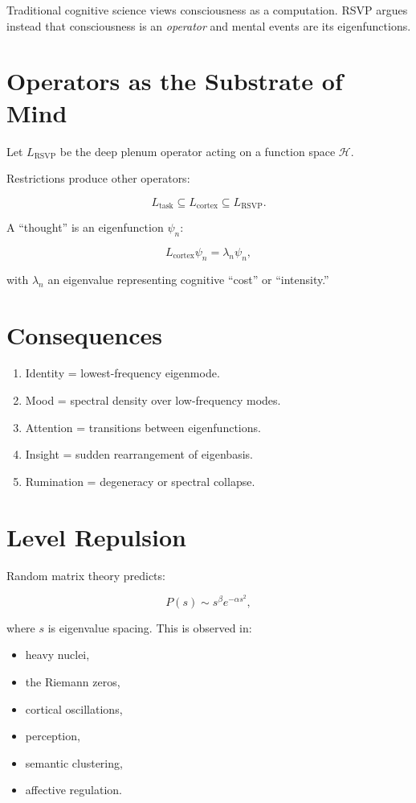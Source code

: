 \documentclass[12pt]{article}
\begin{document}
Traditional cognitive science views consciousness as a computation.  
RSVP argues instead that consciousness is an \emph{operator} and mental events are its eigenfunctions.

\section{Operators as the Substrate of Mind}

Let $L_{\text{RSVP}}$ be the deep plenum operator acting on a function space
$\mathcal{H}$.

Restrictions produce other operators:

\[
L_{\text{task}} \subseteq
L_{\text{cortex}} \subseteq
L_{\text{RSVP}}.
\]

A ``thought'' is an eigenfunction $\psi_n$:

\[
L_{\text{cortex}} \psi_n = \lambda_n \psi_n,
\]

with $\lambda_n$ an eigenvalue representing cognitive ``cost'' or ``intensity.''

\section{Consequences}

\begin{enumerate}
    \item Identity = lowest-frequency eigenmode.
    \item Mood = spectral density over low-frequency modes.
    \item Attention = transitions between eigenfunctions.
    \item Insight = sudden rearrangement of eigenbasis.
    \item Rumination = degeneracy or spectral collapse.
\end{enumerate}

\section{Level Repulsion}

Random matrix theory predicts:

\[
P(s) \sim s^\beta e^{-\alpha s^2},
\]

where $s$ is eigenvalue spacing.  
This is observed in:

\begin{itemize}
    \item heavy nuclei,
    \item the Riemann zeros,
    \item cortical oscillations,
    \item perception,
    \item semantic clustering,
    \item affective regulation.
\end{itemize}
\end{document}
